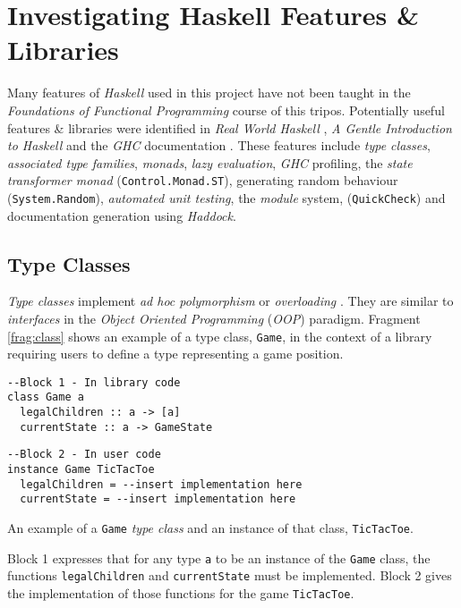 \section{Investigating Haskell Features \& Libraries}
Many features of \textit{Haskell} used in this project have not been taught in the \textit{Foundations of Functional Programming} course of this tripos. Potentially useful features \& libraries were identified in \textit{Real World Haskell} \cite{rwh}, \textit{A Gentle Introduction to Haskell} \cite{gentle} and the \textit{GHC} documentation \cite{docs}. These features include \textit{type classes}, \textit{associated type families}, \textit{monads}, \textit{lazy evaluation}, \textit{GHC} profiling, the \textit{state transformer monad} (\texttt{Control.Monad.ST}), generating random behaviour (\texttt{System.Random}), \textit{automated unit testing}, the \textit{module} system, (\texttt{QuickCheck}) and documentation generation using \textit{Haddock}. 

\subsection{Type Classes}
\textit{Type classes} implement \textit{ad hoc polymorphism} or \textit{overloading} \cite{gentle}. They are similar to \textit{interfaces} in the \textit{Object Oriented Programming} (\textit{OOP}) paradigm. Fragment \ref{frag:class} shows an example of a type class, \texttt{Game}, in the context of a library requiring users to define a type representing a game position.
\begin{fragment}
\begin{lstlisting}
--Block 1 - In library code
class Game a                   
  legalChildren :: a -> [a]    
  currentState :: a -> GameState 
\end{lstlisting}
\begin{lstlisting}
--Block 2 - In user code
instance Game TicTacToe
  legalChildren = --insert implementation here
  currentState = --insert implementation here
\end{lstlisting}
\caption{An example of a \texttt{Game} \textit{type class} and an instance of that class, \texttt{TicTacToe}.}
\label{frag:class}
\end{fragment}
Block 1 expresses that for any type \texttt{a} to be an instance of the \texttt{Game} class, the functions \texttt{legalChildren} and \texttt{currentState} must be implemented. Block 2 gives the implementation of those functions for the game \texttt{TicTacToe}.
